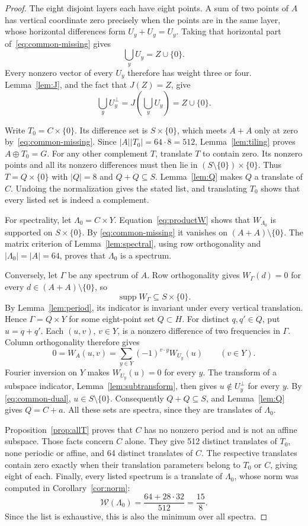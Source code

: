 \documentclass[11pt]{article}
\numberwithin{equation}{section}
\theoremstyle{definition}
\theoremstyle{remark}\newtheorem{remark}[theorem]{Remark}
\newcommand{\supp}{\operatorname{supp}}
\newcommand{\W}{\mathcal W}
\begin{document}
\begin{proof}
The eight disjoint layers each have eight points. A sum of two points
of $A$ has vertical coordinate zero precisely when the points are in
the same layer, whose horizontal differences form $U_y+U_y=U_y$.
Taking that horizontal part of~\eqref{eq:common-missing} gives
\[
 \bigcup_y U_y=Z\cup\{0\}.
\]
Every nonzero vector of every $U_y$ therefore has weight three or four.
Lemma~\ref{lem:J}, and the fact that $J(Z)=Z$, give
\begin{equation}\label{eq:common-dual}
 \bigcup_y U_y^\perp=J\left(\bigcup_y U_y\right)=Z\cup\{0\}.
\end{equation}

Write $T_0=C\times\{0\}$. Its difference set is $S\times\{0\}$,
which meets $A+A$ only at zero by~\eqref{eq:common-missing}.
Since $|A||T_0|=64\cdot8=512$, Lemma~\ref{lem:tiling} proves
$A\oplus T_0=G$. For any other complement $T$, translate $T$ to contain
zero. Its nonzero points and all its nonzero differences must then lie
in $(S\setminus\{0\})\times\{0\}$. Thus $T=Q\times\{0\}$ with
$|Q|=8$ and $Q+Q\subseteq S$. Lemma~\ref{lem:Q} makes $Q$ a translate
of $C$. Undoing the normalization gives the stated list, and translating
$T_0$ shows that every listed set is indeed a complement.

For spectrality, let $\Lambda_0=C\times Y$. Equation~\eqref{eq:productW}
shows that $W_{\Lambda_0}$ is supported on $S\times\{0\}$. By
\eqref{eq:common-missing} it vanishes on $(A+A)\setminus\{0\}$.
The matrix criterion of Lemma~\ref{lem:spectral}, using row orthogonality
and $|\Lambda_0|=|A|=64$, proves that $\Lambda_0$ is a spectrum.

Conversely, let $\Gamma$ be any spectrum of $A$. Row orthogonality gives
$W_\Gamma(d)=0$ for every $d\in(A+A)\setminus\{0\}$, so
\[
 \supp W_\Gamma\subseteq S\times\{0\}.
\]
By Lemma~\ref{lem:period}, its indicator is invariant under every
vertical translation. Hence $\Gamma=Q\times Y$ for some eight-point
set $Q\subset H$. For distinct $q,q'\in Q$, put $u=q+q'$. Each
$(u,v)$, $v\in Y$, is a nonzero difference of two frequencies in
$\Gamma$. Column orthogonality therefore gives
\[
 0=W_A(u,v)=\sum_{y\in Y}(-1)^{v\cdot y}W_{U_y}(u)
 \qquad(v\in Y).
\]
Fourier inversion on $Y$ makes $W_{U_y}(u)=0$ for every $y$.
The transform of a subspace indicator, Lemma~\ref{lem:subtransform},
then gives $u\notin U_y^\perp$ for every $y$. By
\eqref{eq:common-dual}, $u\in S\setminus\{0\}$. Consequently
$Q+Q\subseteq S$, and Lemma~\ref{lem:Q} gives $Q=C+a$.
All these sets are spectra, since they are translates of $\Lambda_0$.

Proposition~\ref{prop:allT} proves that $C$ has no nonzero period and
is not an affine subspace. Those facts concern $C$ alone. They give
512 distinct translates of $T_0$, none periodic or affine, and 64
distinct translates of $C$. The respective translates contain zero
exactly when their translation parameters belong to $T_0$ or $C$,
giving eight of each. Finally, every listed spectrum is a translate of
$\Lambda_0$, whose norm was computed in Corollary~\ref{cor:norm}:
\[
 \W(\Lambda_0)=\frac{64+28\cdot32}{512}=\frac{15}{8}.
\]
Since the list is exhaustive, this is also the minimum over all spectra.
\end{proof}
\end{document}
